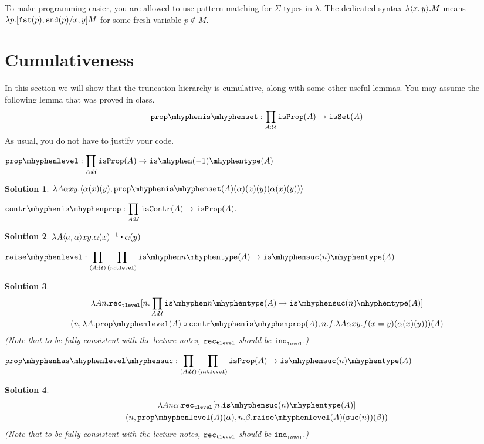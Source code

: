 \documentclass[12pt]{article}
\newcommand{\cut}[1]{}
\newcommand{\marksolution}[1]{\color{FireBrick}#1\normalcolor}%
\newcommand{\marksolution}[1]{\cut{#1}}%
\theoremstyle{plain}
\newtheorem*{solution}{Solution}
\begin{document}
To make programming easier, you are allowed to use pattern matching
for $\Sigma$ types in $\lambda$.
The dedicated syntax $\lambda \langle x,y\rangle.M$
means $\lambda p.[\mathtt{fst}(p),\mathtt{snd}(p)/x,y]M$
for some fresh variable $p \notin M$.

\section{Cumulativeness}

In this section
we will show that the truncation hierarchy is cumulative,
along with some other useful lemmas.
You may assume the following lemma that was proved in class.
\[
  \displaystyle \propisset : \prod_{A:\U} \isprop(A) \to \isset(A)
\]
As usual, you do not have to justify your code.

\begin{task}
  $\displaystyle
    \proplevel : \prod_{A : \U} \isprop(A) \to \istype{(-1)}(A)
  $
\end{task}
\marksolution{
\begin{solution}
  $
    \lambda A \alpha x y.\pair{\alpha(x)(y)}{\propisset(A)(\alpha)(x)(y)(\alpha(x)(y))}
  $
\end{solution}
}

\begin{task}
  $\displaystyle
    \contrisprop : \prod_{A : \U} \iscontr(A) \to \isprop(A).
  $
\end{task}
\marksolution{
\begin{solution}
  $
    \lambda A\tuple{a}{\alpha} x y.\alpha(x)^{-1} \concat \alpha(y)
  $
\end{solution}
}

\begin{task}
  $\displaystyle
    \raiselevel :
    \prod_{(A:\U)}
    \prod_{(n:\tlevel)}
    \istype{n}(A) \to \istype{\suc(n)}(A)
  $
\end{task}
\marksolution{
\begin{solution}
  \begin{multline*}
    \lambda An.\trec[n.\prod_{A:\U}\istype{n}(A) \to \istype{\suc(n)}(A)]\\
    (n,\lambda A.\proplevel(A) \comp \contrisprop(A),n.f.\lambda A\alpha xy.f(x=y)(\alpha(x)(y)))(A)
  \end{multline*}
  (Note that to be fully consistent with the lecture notes, $\mathtt{rec}_{\mathtt{tlevel}}$ should be $\mathtt{ind}_\mathtt{level}$.)
\end{solution}
}

\begin{task}
  $\displaystyle
  \prophaslevelsuc :
  \prod_{(A:\U)}
  \prod_{(n:\tlevel)}
  \isprop(A) \to \istype{\suc(n)}(A)
  $
\end{task}
\marksolution{
  \begin{solution}
    \begin{multline*}
      \lambda An\alpha.\trec[n.\istype{\suc(n)}(A)]\\
      (n,\proplevel(A)(\alpha),n.\beta.\raiselevel(A)(\suc(n))(\beta))
    \end{multline*}
    (Note that to be fully consistent with the lecture notes, $\mathtt{rec}_{\mathtt{tlevel}}$ should be $\mathtt{ind}_\mathtt{level}$.)
  \end{solution}
}
\end{document}
